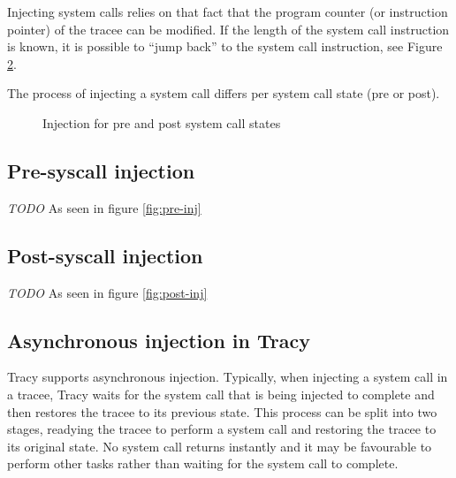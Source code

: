 \documentclass[a4paper, 10pt]{report}
\begin{document}
Injecting system calls relies on that fact that the program counter (or
instruction pointer) of the tracee can be modified. If the length of the system
call instruction is known, it is possible to ``jump back'' to the system call
instruction, see Figure \ref{fig:asm-jump}.


The process of injecting a system call differs per system call state (pre or
post).

\begin{figure}
    \centering
    \hspace{1em}
    \caption{Injection for pre and post system call states}
    \label{fig:injection}
\end{figure}

\begin{figure}
    \caption{} %
    \label{fig:asm-jump}
\end{figure}


\subsection{Pre-syscall injection}

\textit{TODO}
As seen in figure \ref{fig:pre-inj}

\subsection{Post-syscall injection}

\textit{TODO}
As seen in figure \ref{fig:post-inj}


\subsection{Asynchronous injection in Tracy}

Tracy supports asynchronous injection. Typically, when injecting a system call
in a tracee, Tracy waits for the system call that is being injected to complete
and then restores the tracee to its previous state. This process can be split
into two stages, readying the tracee to perform a system call and restoring
the tracee to its original state. No system call returns instantly and it
may be favourable to perform other tasks rather than waiting for the system
call to complete.
\end{document}
